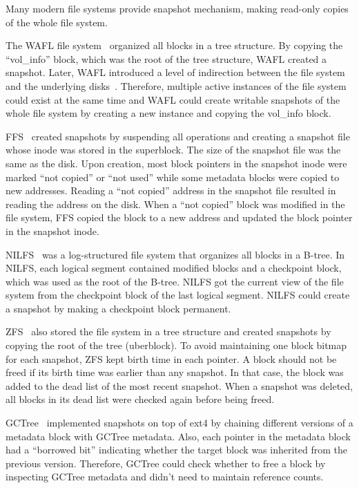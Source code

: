Many modern file systems provide snapshot mechanism, making read-only copies of
the whole file system.

The WAFL file system~\citep{wafl} organized all blocks in a tree structure.
By copying the ``vol\_info'' block, which was the root of the tree structure,
WAFL created a snapshot.
Later, WAFL introduced a level of indirection between the file system and the
underlying disks~\citep{wafl-flexvol}.
Therefore, multiple active instances of the file system could exist at the same
time and WAFL could create writable snapshots of the whole file system by creating
a new instance and copying the vol\_info block.

FFS~\citep{ffs1,ffs2} created snapshots by suspending all operations and creating a
snapshot file whose inode was stored in the superblock.
The size of the snapshot file was the same as the disk.
Upon creation, most block pointers in the snapshot inode were marked
``not copied'' or ``not used'' while some metadata blocks were copied to new
addresses.
Reading a ``not copied'' address in the snapshot file resulted in reading the
address on the disk.
When a ``not copied'' block was modified in the file system, FFS copied the block
to a new address and updated the block pointer in the snapshot inode.

NILFS~\citep{nilfs2} was a log-structured file system that organizes all blocks
in a B-tree.
In NILFS, each logical segment contained modified blocks and a checkpoint block,
which was used as the root of the B-tree.
NILFS got the current view of the file system from the checkpoint block
of the last logical segment.
NILFS could create a snapshot by making a checkpoint block permanent.

ZFS~\citep{zfs} also stored the file system in a tree structure and created
snapshots by copying the root of the tree (uberblock).
To avoid maintaining one block bitmap for each snapshot, ZFS kept birth time
in each pointer.
A block should not be freed if its birth time was earlier than any snapshot.
In that case, the block was added to the dead list of the most recent snapshot.
When a snapshot was deleted,
all blocks in its dead list were checked again before being freed.

GCTree~\citep{gctree} implemented snapshots on top of ext4
by chaining different versions of a metadata block with GCTree metadata.
Also, each pointer in the metadata block had a ``borrowed bit'' indicating
whether the target block was inherited from the previous version.
Therefore, GCTree could check whether to free a block by inspecting GCTree
metadata and didn't need to maintain reference counts.

